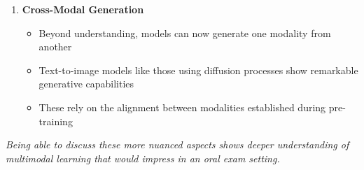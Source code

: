 \begin{enumerate}
    \item \textbf{Cross-Modal Generation}
    \begin{itemize}
        \item Beyond understanding, models can now generate one modality from another
        \item Text-to-image models like those using diffusion processes show remarkable generative capabilities
        \item These rely on the alignment between modalities established during pre-training
    \end{itemize}
\end{enumerate}

\vspace{0.5em}
\textit{Being able to discuss these more nuanced aspects shows deeper understanding of multimodal learning that would impress in an oral exam setting.}
